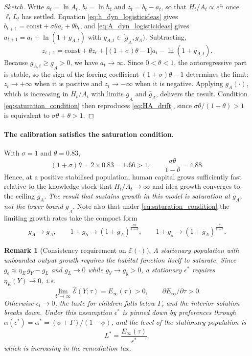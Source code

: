 \documentclass[11pt]{article}
\newtheorem{remark}{Remark}
\begin{document}
\begin{proof}[Sketch]
Write $a_t=\ln A_t$, $b_t=\ln h_t$ and $z_t=b_t-a_t$, so that $H_t/A_t\propto e^{z_t}$ once
$\ell_tL_t$ has settled. Equation \eqref{eq:h_dyn_logisticideas} gives
$b_{t+1}=\text{const}+\sigma\theta a_t+\theta b_t$, and \eqref{eq:A_dyn_logisticideas} gives
$a_{t+1}=a_t+\ln(1+g_{A,t})$ with $g_{A,t}\in[\underline g_A,\bar g_A)$. Subtracting,
\[
z_{t+1}=\text{const}+\theta z_t+\big[(1+\sigma)\theta-1\big]a_t-\ln(1+g_{A,t}).
\]
Because $g_{A,t}\ge\underline g_A>0$, we have $a_t\to\infty$. Since $0<\theta<1$, the autoregressive
part is stable, so the sign of the forcing coefficient $(1+\sigma)\theta-1$ determines the limit:
$z_t\to+\infty$ when it is positive and $z_t\to-\infty$ when it is negative. Applying
$g_A(\cdot)$, which is increasing in $H_t/A_t$ with limits $\underline g_A$ and $\bar g_A$, delivers
the result. Condition \eqref{eq:saturation_condition} then reproduces \eqref{eq:HA_drift}, since
$\sigma\theta/(1-\theta)>1$ is equivalent to $\sigma\theta+\theta>1$.
\end{proof}

\paragraph{The calibration satisfies the saturation condition.}
With $\sigma=1$ and $\theta=0.83$,
\[
(1+\sigma)\theta=2\times 0.83=1.66>1,
\qquad
\frac{\sigma\theta}{1-\theta}=4.88 .
\]
Hence, at a positive stabilised population, human capital grows sufficiently fast relative to the
knowledge stock that $H_t/A_t\to\infty$ and idea growth converges to the ceiling $\bar g_A$.
\emph{The result that sustains growth in this model is saturation at $\bar g_A$, not the
lower bound $\underline g_A$.} Note also that under \eqref{eq:saturation_condition} the limiting
growth rates take the compact form
\begin{align}
g_A\to\bar g_A,
\qquad
1+g_h\to(1+\bar g_A)^{\frac{\sigma\theta}{1-\theta}},
\qquad
1+g_y\to(1+\bar g_A)^{\frac{\sigma}{1-\theta}} .
\label{eq:limits_saturated}
\end{align}

\begin{remark}[Consistency requirement on $\mathcal{E}(\cdot)$]
\label{rem:E_saturates}
A stationary population with unbounded output growth requires the habitat function itself to
saturate. Since $g_\epsilon\approx\eta_E\,g_Y-g_L$ and $g_L\to 0$ while $g_Y\to g_y>0$,
a stationary $\epsilon^\ast$ requires $\eta_E(Y)\to 0$, i.e.
\[
\lim_{Y\to\infty}\widehat{\mathcal{E}}(Y;\tau)=E_\infty(\tau)>0,
\qquad \partial E_\infty/\partial\tau>0 .
\]
Otherwise $\epsilon_t\to 0$, the taste for children falls below $\Gamma$, and the interior solution
breaks down. Under this assumption $\epsilon^\ast$ is pinned down by preferences through
$\alpha(\epsilon^\ast)=\alpha^\ast=(\phi+\Gamma)/(1-\phi)$, and the \emph{level} of the stationary
population is
\[
L^\ast=\frac{E_\infty(\tau)}{\epsilon^\ast},
\]
which is increasing in the remediation tax.
\end{remark}
\end{document}

